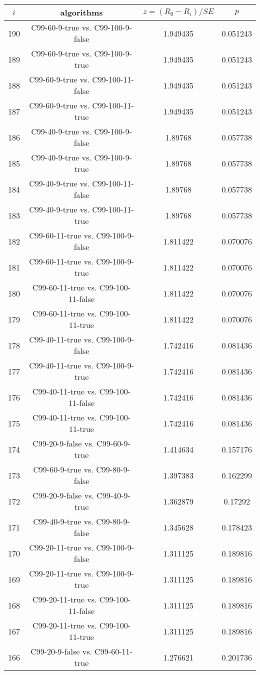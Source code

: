 \documentclass[a4paper,10pt]{article}
\begin{document}
\begin{landscape}
\begin{table}[!htp]
\centering\scriptsize
\begin{tabular}{cccc}
$i$&algorithms&$z=(R_0 - R_i)/SE$&$p$\\
\hline190&C99-60-9-true vs. C99-100-9-false&1.949435&0.051243\\
189&C99-60-9-true vs. C99-100-9-true&1.949435&0.051243\\
188&C99-60-9-true vs. C99-100-11-false&1.949435&0.051243\\
187&C99-60-9-true vs. C99-100-11-true&1.949435&0.051243\\
186&C99-40-9-true vs. C99-100-9-false&1.89768&0.057738\\
185&C99-40-9-true vs. C99-100-9-true&1.89768&0.057738\\
184&C99-40-9-true vs. C99-100-11-false&1.89768&0.057738\\
183&C99-40-9-true vs. C99-100-11-true&1.89768&0.057738\\
182&C99-60-11-true vs. C99-100-9-false&1.811422&0.070076\\
181&C99-60-11-true vs. C99-100-9-true&1.811422&0.070076\\
180&C99-60-11-true vs. C99-100-11-false&1.811422&0.070076\\
179&C99-60-11-true vs. C99-100-11-true&1.811422&0.070076\\
178&C99-40-11-true vs. C99-100-9-false&1.742416&0.081436\\
177&C99-40-11-true vs. C99-100-9-true&1.742416&0.081436\\
176&C99-40-11-true vs. C99-100-11-false&1.742416&0.081436\\
175&C99-40-11-true vs. C99-100-11-true&1.742416&0.081436\\
174&C99-20-9-false vs. C99-60-9-true&1.414634&0.157176\\
173&C99-60-9-true vs. C99-80-9-false&1.397383&0.162299\\
172&C99-20-9-false vs. C99-40-9-true&1.362879&0.17292\\
171&C99-40-9-true vs. C99-80-9-false&1.345628&0.178423\\
170&C99-20-11-true vs. C99-100-9-false&1.311125&0.189816\\
169&C99-20-11-true vs. C99-100-9-true&1.311125&0.189816\\
168&C99-20-11-true vs. C99-100-11-false&1.311125&0.189816\\
167&C99-20-11-true vs. C99-100-11-true&1.311125&0.189816\\
166&C99-20-9-false vs. C99-60-11-true&1.276621&0.201736\\

\end{tabular}
\end{table}
\end{landscape}
\end{document}
